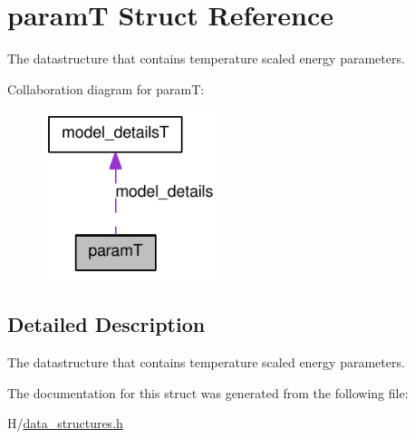 \hypertarget{structparamT}{
\section{paramT Struct Reference}
\label{structparamT}
}


The datastructure that contains temperature scaled energy parameters.  




Collaboration diagram for paramT:\nopagebreak
\begin{figure}[H]
\begin{center}
\leavevmode
\includegraphics[width=146pt]{structparamT__coll__graph}
\end{center}
\end{figure}


\subsection{Detailed Description}
The datastructure that contains temperature scaled energy parameters. 

The documentation for this struct was generated from the following file:\begin{DoxyCompactItemize}
\item 
H/\hyperlink{data__structures_8h}{data\_\-structures.h}\end{DoxyCompactItemize}
